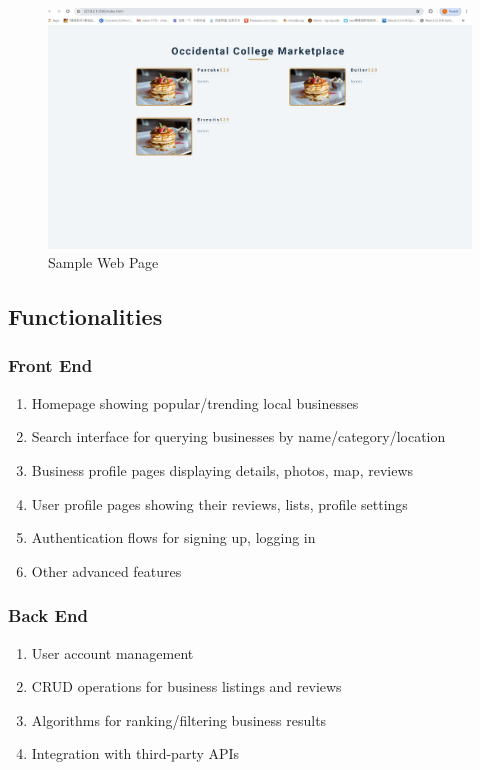 \documentclass[10pt,twocolumn]{article}
\begin{document}
       \begin{figure}
    \centering
    \includegraphics[width=\linewidth]{SampleWebpage.jpg}
    \caption{Sample Web Page}
    \label{fig:my_label}
   \end{figure}

    \subsection{Functionalities}
    \subsubsection{Front End}
    \begin{enumerate}
        \item Homepage showing popular/trending local businesses 
        \item Search interface for querying businesses by name/category/location
        \item Business profile pages displaying details, photos, map, reviews
        \item User profile pages showing their reviews, lists, profile settings
        \item Authentication flows for signing up, logging in 
        \item Other advanced features

    \end{enumerate}
    \subsubsection{Back End}
    \begin{enumerate}
        \item User account management
        \item CRUD operations for business listings and reviews
        \item Algorithms for ranking/filtering business results 
        \item Integration with third-party APIs

    \end{enumerate}
\end{document}
